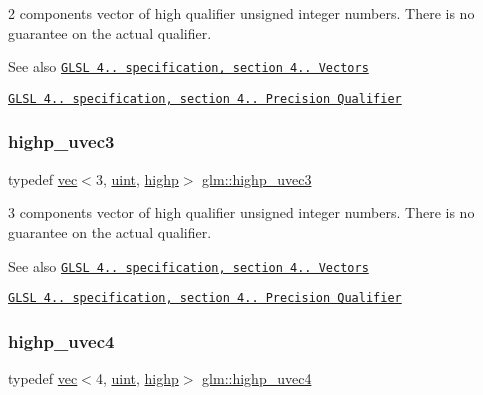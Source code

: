 2 components vector of high qualifier unsigned integer numbers. There is no guarantee on the actual qualifier.

\begin{DoxySeeAlso}{See also}
\href{http://www.opengl.org/registry/doc/GLSLangSpec.4.20.8.pdf}{\tt G\+L\+SL 4.. specification, section 4.. Vectors} 

\href{http://www.opengl.org/registry/doc/GLSLangSpec.4.20.8.pdf}{\tt G\+L\+SL 4.. specification, section 4.. Precision Qualifier} 
\end{DoxySeeAlso}
\mbox{\label{group__core__precision_ga2e16953ad75ce0c6d7faa921ca006ce5}} 
\subsubsection{\texorpdfstring{highp\+\_\+uvec3}{highp\_uvec3}}
{\footnotesize\ttfamily typedef \mbox{\hyperlink{structglm_1_1vec}{vec}}$<$3, \mbox{\hyperlink{group__core__precision_ga4fd29415871152bfb5abd588334147c8}{uint}}, \mbox{\hyperlink{namespaceglm_a36ed105b07c7746804d7fdc7cc90ff25ac6f7eab42eacbb10d59a58e95e362074}{highp}}$>$ \mbox{\hyperlink{group__core__precision_ga2e16953ad75ce0c6d7faa921ca006ce5}{glm\+::highp\+\_\+uvec3}}}

3 components vector of high qualifier unsigned integer numbers. There is no guarantee on the actual qualifier.

\begin{DoxySeeAlso}{See also}
\href{http://www.opengl.org/registry/doc/GLSLangSpec.4.20.8.pdf}{\tt G\+L\+SL 4.. specification, section 4.. Vectors} 

\href{http://www.opengl.org/registry/doc/GLSLangSpec.4.20.8.pdf}{\tt G\+L\+SL 4.. specification, section 4.. Precision Qualifier} 
\end{DoxySeeAlso}
\mbox{\label{group__core__precision_gae48d6e9a99afc33e6fa51e5d576dfd1a}} 
\subsubsection{\texorpdfstring{highp\+\_\+uvec4}{highp\_uvec4}}
{\footnotesize\ttfamily typedef \mbox{\hyperlink{structglm_1_1vec}{vec}}$<$4, \mbox{\hyperlink{group__core__precision_ga4fd29415871152bfb5abd588334147c8}{uint}}, \mbox{\hyperlink{namespaceglm_a36ed105b07c7746804d7fdc7cc90ff25ac6f7eab42eacbb10d59a58e95e362074}{highp}}$>$ \mbox{\hyperlink{group__core__precision_gae48d6e9a99afc33e6fa51e5d576dfd1a}{glm\+::highp\+\_\+uvec4}}}

